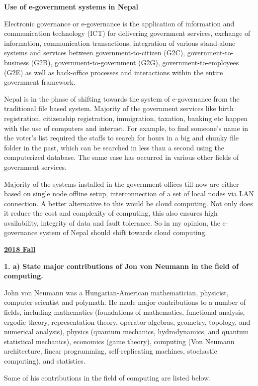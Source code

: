 \documentclass [12pt, a4paper]{article}
\begin{document}
\begin{center}
	\textbf{Use of e-government systems in Nepal}\\
\end{center}

Electronic governance or e-governance is the application of information and communication technology (ICT) for delivering government services, exchange of information, communication transactions, integration of various stand-alone systems and services between government-to-citizen (G2C), government-to-business (G2B), government-to-government (G2G), government-to-employees (G2E) as well as back-office processes and interactions within the entire government framework.\\
\par
Nepal is in the phase of shifting towards the system of e-governance from the traditional file based system. Majority of the government services like birth registration, citizenship registration, immigration, taxation, banking etc happen with the use of computers and internet. For example, to find someone's name in the voter's list required the staffs to search for hours in a big and chunky file folder in the past, which can be searched in less than a second using the computerized database. The same ease has occurred in various other fields of government services.\\
\par
Majority of the systems installed in the government offices till now are either based on single node offline setup, interconnection of a set of local nodes via LAN connection. A better alternative to this would be cloud computing. Not only does it reduce the cost and complexity of computing, this also ensures high availability, integrity of data and fault tolerance. So in my opinion, the e-governance system of Nepal should shift towards cloud computing.

\break

\large
\begin{center}
	\underline{\textbf{2018 Fall}}
\end{center}

\textbf{1. a) State major contributions of Jon von Neumann in the field of computing.}\\
\normalsize

John von Neumann was a Hungarian-American mathematician, physicist, computer scientist and polymath. He made major contributions to a number of fields, including mathematics (foundations of mathematics, functional analysis, ergodic theory, representation theory, operator algebras, geometry, topology, and numerical analysis), physics (quantum mechanics, hydrodynamics, and quantum statistical mechanics), economics (game theory), computing (Von Neumann architecture, linear programming, self-replicating machines, stochastic computing), and statistics.\\
\par
Some of his contributions in the field of computing are listed below.
\end{document}

